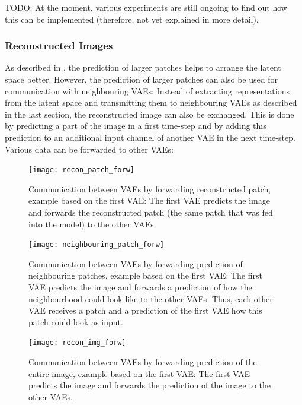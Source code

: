 TODO: At the moment, various experiments are still ongoing to find out how this can be implemented (therefore, not yet explained in more detail).


\subsubsection{Reconstructed Images}
As described in , the prediction of larger patches helps to arrange the latent space better. However, the prediction of larger patches can also be used for communication with neighbouring VAEs: Instead of extracting representations from the latent space and transmitting them to neighbouring VAEs as described in the last section, the reconstructed image can also be exchanged. This is done by predicting a part of the image in a first time-step and by adding this prediction to an additional input channel of another VAE in the next time-step. Various data can be forwarded to other VAEs:


\begin{figure}
    \centering
    \texttt{[image: recon\_patch\_forw]}
    \caption[Communication between VAEs by forwarding reconstructed patch]{Communication between VAEs by forwarding reconstructed patch, example based on the first VAE: The first VAE predicts the image and forwards the reconstructed patch (the same patch that was fed into the model) to the other VAEs.}
\end{figure}

\begin{figure}
    \centering
    \texttt{[image: neighbouring\_patch\_forw]}
    \caption[Communication between VAEs by forwarding prediction of neighbouring patches]{Communication between VAEs by forwarding prediction of neighbouring patches, example based on the first VAE: The first VAE predicts the image and forwards a prediction of how the neighbourhood could look like to the other VAEs. Thus, each other VAE receives a patch and a prediction of the first VAE how this patch could look as input.}
\end{figure}

\begin{figure}
    \centering
    \texttt{[image: recon\_img\_forw]}
    \caption[Communication between VAEs by forwarding prediction of the entire image]{Communication between VAEs by forwarding prediction of the entire image, example based on the first VAE: The first VAE predicts the image and forwards the prediction of the image to the other VAEs.}
\end{figure}



